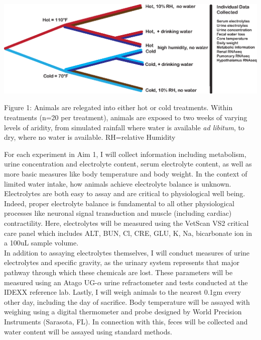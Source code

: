 \documentclass[11pt]{article}
\begin{document}
\vspace{2mm}

\begin{mdframed}
 \begin{center}
  \includegraphics[width=1\textwidth]{exp_design_fig.eps}
 \end{center} 

\noindent \small{Figure 1: Animals are relegated into either hot or cold treatments. Within treatments (n=20 per treatment), animals are exposed to two weeks of varying levels of aridity, from simulated rainfall where water is available \textit{ad libitum}, to dry, where no water is available. RH=relative Humidity}

\end{mdframed}

\vspace{5mm}


For each experiment in Aim 1, I will collect information including metabolism, urine concentration and electrolyte content, serum electrolyte content, as well as more basic measures like body temperature and body weight. In the context of limited water intake, how animals achieve electrolyte balance is unknown. Electrolytes are both easy to assay and are critical to physiological well being. Indeed, proper electrolyte balance is fundamental to all other physiological processes like neuronal signal transduction and muscle (including cardiac) contractility. Here, electrolytes will be measured using the VetScan VS2 critical care panel which includes ALT, BUN, Cl, CRE, GLU, K, Na, bicarbonate ion in a 100uL sample volume. \\

In addition to assaying electrolytes themselves, I will conduct measures of urine electrolytes and specific gravity, as the urinary system represents that major pathway through which these chemicals are lost. These parameters will be measured using an Atago UG-$\alpha$ urine refractometer and tests conducted at the IDEXX reference lab. Lastly, I will weigh animals to the nearest 0.1gm every other day, including the day of sacrifice. Body temperature will be assayed with weighing using a digital thermometer and probe designed by World Precision Instruments (Sarasota, FL). In connection with this, feces will be collected and water content will be assayed using standard methods. \\
\end{document}
